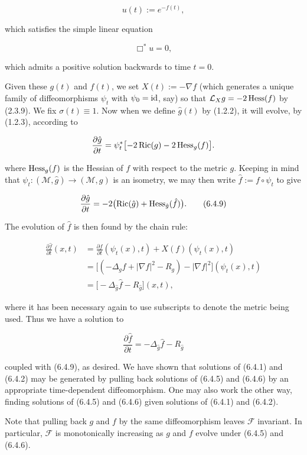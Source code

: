 \[
u(t) := e^{-f(t)},
\tag{6.4.7}
\]

which satisfies the simple linear equation

\[
\Box^{*}u = 0,
\tag{6.4.8}
\]

which admits a positive solution backwards to time $t=0$.

Given these $g(t)$ and $f(t)$, we set $X(t) := -\nabla f$ (which generates a unique family of diffeomorphisms $\psi_t$ with $\psi_0 = \operatorname{id}$, say) so that $\mathcal L_X g = -2\operatorname{Hess}(f)$ by (2.3.9). We fix $\sigma(t) \equiv 1$. Now when we define $\hat g(t)$ by (1.2.2), it will evolve, by (1.2.3), according to

\[
\frac{\partial \hat g}{\partial t}
= \psi_t^{*}\bigl[-2\operatorname{Ric}(g) - 2\operatorname{Hess}_g(f)\bigr].
\]

where $\operatorname{Hess}_g(f)$ is the Hessian of $f$ with respect to the metric $g$. Keeping in mind that $\psi_t : (\mathcal M,\hat g) \to (\mathcal M,g)$ is an isometry, we may then write $\hat f := f \circ \psi_t$ to give

\[
\frac{\partial \hat g}{\partial t}
= -2\bigl(\operatorname{Ric}(\hat g) + \operatorname{Hess}_{\hat g}(\hat f)\bigr).
\tag{6.4.9}
\]

The evolution of $\hat f$ is then found by the chain rule:

\[
\begin{aligned}
\frac{\partial \hat f}{\partial t}(x,t)
&= \frac{\partial f}{\partial t}(\psi_t(x),t) + X(f)(\psi_t(x),t) \\
&= \bigl[(-\Delta_g f + \lvert \nabla f\rvert^2 - R_g) - \lvert \nabla f\rvert^2\bigr](\psi_t(x),t) \\
&= \bigl[-\Delta_{\hat g}\hat f - R_{\hat g}\bigr](x,t),
\end{aligned}
\]

where it has been necessary again to use subscripts to denote the metric being used. Thus we have a solution to

\[
\frac{\partial \hat f}{\partial t} = -\Delta_{\hat g}\hat f - R_{\hat g}
\tag{6.4.10}
\]

coupled with (6.4.9), as desired. We have shown that solutions of (6.4.1) and (6.4.2) may be generated by pulling back solutions of (6.4.5) and (6.4.6)
by an appropriate time-dependent diffeomorphism. One may also work the other way, finding solutions of (6.4.5) and (6.4.6) given solutions of (6.4.1) and (6.4.2).

Note that pulling back $g$ and $f$ by the same diffeomorphism leaves $\mathcal F$ invariant. In particular, $\mathcal F$ is monotonically increasing as $g$ and $f$ evolve under (6.4.5) and (6.4.6).


